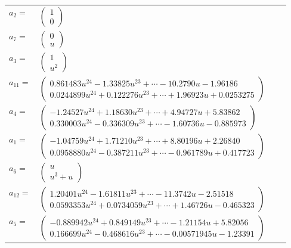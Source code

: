 \documentclass[1p]{elsarticle_modified}
\theoremstyle{definition}
\begin{document}
\begin{tabular}{m{7pt} m{180pt} m{7pt} m{180pt} }
\flushright $a_{2}=$&$\begin{pmatrix}1\\0\end{pmatrix}$ \\
\flushright $a_{7}=$&$\begin{pmatrix}0\\u\end{pmatrix}$ \\
\flushright $a_{3}=$&$\begin{pmatrix}1\\u^2\end{pmatrix}$ \\
\flushright $a_{11}=$&$\begin{pmatrix}0.861483 u^{24}-1.33825 u^{23}+\cdots-10.2790 u-1.96186\\0.0244899 u^{24}+0.122276 u^{23}+\cdots+1.96923 u+0.0253275\end{pmatrix}$ \\
\flushright $a_{4}=$&$\begin{pmatrix}-1.24527 u^{24}+1.18630 u^{23}+\cdots+4.94727 u+5.83862\\0.330003 u^{24}-0.336309 u^{23}+\cdots-1.60736 u-0.885973\end{pmatrix}$ \\
\flushright $a_{1}=$&$\begin{pmatrix}-1.04759 u^{24}+1.71210 u^{23}+\cdots+8.80196 u+2.26840\\0.0958880 u^{24}-0.387211 u^{23}+\cdots-0.961789 u+0.417723\end{pmatrix}$ \\
\flushright $a_{6}=$&$\begin{pmatrix}u\\u^3+u\end{pmatrix}$ \\
\flushright $a_{12}=$&$\begin{pmatrix}1.20401 u^{24}-1.61811 u^{23}+\cdots-11.3742 u-2.51518\\0.0593353 u^{24}+0.0734059 u^{23}+\cdots+1.46726 u-0.465323\end{pmatrix}$ \\
\flushright $a_{5}=$&$\begin{pmatrix}-0.889942 u^{24}+0.849149 u^{23}+\cdots-1.21154 u+5.82056\\0.166699 u^{24}-0.468616 u^{23}+\cdots-0.00571945 u-1.23391\end{pmatrix}$ \\

\end{tabular}
\end{document}
